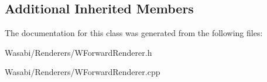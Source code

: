 \subsection*{Additional Inherited Members}


The documentation for this class was generated from the following files\+:\begin{DoxyCompactItemize}
\item 
Wasabi/\+Renderers/W\+Forward\+Renderer.\+h\item 
Wasabi/\+Renderers/W\+Forward\+Renderer.\+cpp\end{DoxyCompactItemize}
